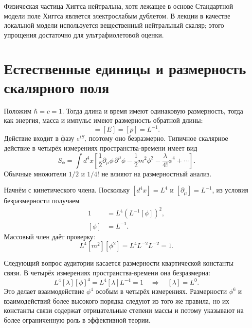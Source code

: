 Физическая частица Хиггса нейтральна, хотя лежащее в основе Стандартной модели поле Хиггса является электрослабым дублетом. В лекции в качестве локальной модели используется вещественный нейтральный скаляр; этого упрощения достаточно для ультрафиолетовой оценки.

\section{Естественные единицы и размерность скалярного поля}

Положим \(\hbar=c=1\). Тогда длина и время имеют одинаковую размерность, тогда как энергия, масса и импульс имеют размерность обратной длины:
\begin{equation}
[m]=[E]=[p]=L^{-1}.
\end{equation}
Действие входит в фазу \(e^{iS}\), поэтому оно безразмерно. Типичное скалярное действие в четырёх измерениях пространства-времени имеет вид
\begin{equation}
S_\phi=\int d^4x\left[
\frac12\partial_\mu\phi\,\partial^\mu\phi
-\frac12m^2\phi^2
-\frac{\lambda}{4!}\phi^4
+\cdots\right].
\end{equation}
Обычные множители \(1/2\) и \(1/4!\) не влияют на размерностный анализ.

Начнём с кинетического члена. Поскольку \([d^4x]=L^4\) и \([\partial_\mu]=L^{-1}\), из условия безразмерности получаем
\begin{align}
1
&=L^4\left(L^{-1}[\phi]\right)^2,\\
[\phi]&=L^{-1}.
\end{align}
Массовый член даёт проверку:
\begin{equation}
L^4[m^2][\phi^2]
=L^4L^{-2}L^{-2}=1.
\end{equation}

Следующий вопрос аудитории касается размерности квартической константы связи. В четырёх измерениях пространства-времени она безразмерна:
\begin{equation}
L^4[\lambda][\phi]^4=L^4[\lambda]L^{-4}=1
\quad\Longrightarrow\quad [\lambda]=L^0.
\end{equation}
Это делает взаимодействие \(\phi^4\) особым в четырёх измерениях. Размерности \(\phi^6\) и взаимодействий более высокого порядка следуют из того же правила, но их константы связи содержат отрицательные степени массы и потому указывают на более ограниченную роль в эффективной теории.

